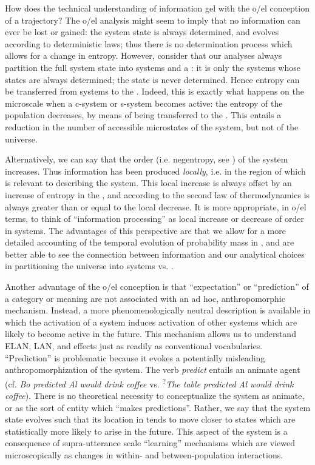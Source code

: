 How does the technical understanding of information gel with the o/el conception of a  trajectory? The o/el analysis might seem to imply that no information can ever be lost or gained: the system state is always determined, and evolves according to deterministic laws; thus there is no determination process which allows for a change in entropy. However, consider that our analyses always partition the full system state into systems and a : it is only the systems whose states are always determined; the  state is never determined. Hence entropy can be transferred from systems to the . Indeed, this is exactly what happens on the microscale when a c-sys\-tem or s-sys\-tem becomes active: the entropy of the population decreases, by means of being transferred to the . This entails a reduction in the number of accessible microstates of the system, but not of the universe.

Alternatively, we can say that the order (i.e. negentropy, see \citealt{Schrödinger1944}) of the system increases. Thus information has been produced \textit{locally}, i.e. in the region of  which is relevant to describing the system. This local increase is always offset by an increase of entropy in the , and according to the second law of thermodynamics is always greater than or equal to the local decrease. It is more appropriate, in o/el terms, to think of “information processing” as local increase or decrease of order in systems. The advantages of this perspective are that we allow for a more detailed accounting of the temporal evolution of probability mass in , and are better able to see the connection between information and our analytical choices in partitioning the universe into systems vs. . 

Another advantage of the o/el conception is that “expectation” or “prediction” of a category or meaning are not associated with an ad hoc, anthropomorphic mechanism. Instead, a more phenomenologically neutral description is available in which the activation of a system induces activation of other systems which are likely to become active in the future. This mechanism allows us to understand ELAN, LAN, and  effects just as readily as conventional vocabularies. “Prediction” is problematic because it evokes a potentially misleading anthropomorphization of the system. The verb \textit{predict} entails an animate agent (cf. \textit{Bo predicted Al would drink coffee} vs. \textsuperscript{?}\textit{The table predicted Al would drink coffee}). There is no theoretical necessity to conceptualize the system as animate, or as the sort of entity which “makes predictions”. Rather, we say that the system state evolves such that its location in  tends to move closer to states which are statistically more likely to arise in the future. This aspect of the system is a consequence of supra-utterance scale “learning” mechanisms which are viewed microscopically as changes in within- and between-population interactions.


